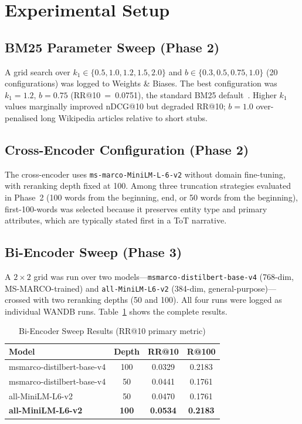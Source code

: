 \documentclass[conference]{IEEEtran}
\begin{document}
\section{Experimental Setup}
\label{sec:exp}

\subsection{BM25 Parameter Sweep (Phase 2)}
A grid search over $k_1 \in \{0.5, 1.0, 1.2, 1.5, 2.0\}$ and
$b \in \{0.3, 0.5, 0.75, 1.0\}$ (20 configurations) was logged to Weights \& Biases.
The best configuration was $k_1=1.2$, $b=0.75$ (RR@10~=~0.0751), the standard BM25
default~\cite{bm25}.
Higher $k_1$ values marginally improved nDCG@10 but degraded RR@10;
$b=1.0$ over-penalised long Wikipedia articles relative to short stubs.

\subsection{Cross-Encoder Configuration (Phase 2)}
The cross-encoder uses \texttt{ms-marco-MiniLM-L-6-v2} without domain fine-tuning,
with reranking depth fixed at 100.
Among three truncation strategies evaluated in Phase~2 (100 words from the beginning,
end, or 50 words from the beginning), first-100-words was selected because it
preserves entity type and primary attributes, which are typically stated first
in a ToT narrative.

\subsection{Bi-Encoder Sweep (Phase 3)}
A $2\times2$ grid was run over two models---\texttt{msmarco-distilbert-base-v4}
(768-dim, MS-MARCO-trained) and \texttt{all-MiniLM-L6-v2} (384-dim, general-purpose)---
crossed with two reranking depths (50 and 100).
All four runs were logged as individual WANDB runs.
Table~\ref{tab:bisweep} shows the complete results.

\begin{table}[t]
\caption{Bi-Encoder Sweep Results (RR@10 primary metric)}
\label{tab:bisweep}
\centering
\begin{tabular}{lccc}
\toprule
Model & Depth & RR@10 & R@100 \\
\midrule
msmarco-distilbert-base-v4 & 100 & 0.0329 & 0.2183 \\
msmarco-distilbert-base-v4 &  50 & 0.0441 & 0.1761 \\
all-MiniLM-L6-v2           &  50 & 0.0470 & 0.1761 \\
\textbf{all-MiniLM-L6-v2}  & \textbf{100} & \textbf{0.0534} & \textbf{0.2183} \\
\bottomrule
\end{tabular}
\end{table}
\end{document}

